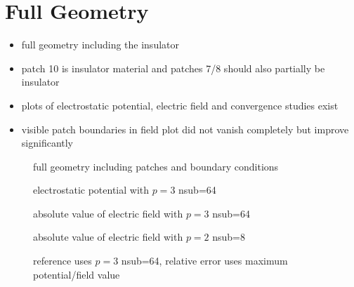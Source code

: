 \section{Full Geometry}
\begin{itemize}
  \item full geometry including the insulator
  \item patch 10 is insulator material and patches 7/8 should also partially be insulator
  \item plots of electrostatic potential, electric field and convergence studies exist
  \item visible patch boundaries in field plot did not vanish completely but improve significantly
\end{itemize}

\begin{center}
\begin{figure}[H]
  
  \caption{full geometry including patches and boundary conditions}
\end{figure}
\end{center}

\begin{center}
\begin{figure}[p]
  
    \caption{electrostatic potential with $p=3$ nsub=64}
\end{figure}
\end{center}

\begin{center}
\begin{figure}[p]
  
  \caption{absolute value of electric field with $p=3$ nsub=64}
\end{figure}
\end{center}

\begin{center}
\begin{figure}[p]
  
  \caption{absolute value of electric field with $p=2$ nsub=8}
\end{figure}
\end{center}

\begin{figure}[p]
  \hspace{-2.5cm}
  
  \caption{reference uses $p=3$ nsub=64, relative error uses maximum potential/field value}
\end{figure}
